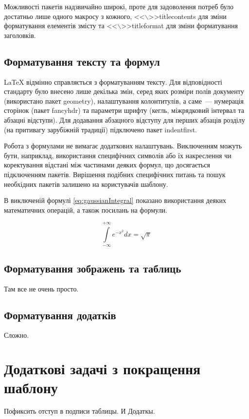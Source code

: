 Можливості пакетів надзвичайно широкі, проте для задоволення потреб було достатньо лише одного макросу з кожного, <<$\backslash$>>titlecontents для зміни форматування елементів змісту та <<$\backslash$>>titleformat для зміни форматування заголовків.

\subsection{Форматування тексту та формул}

\LaTeX{} відмінно справляється з форматуванням тексту. Для відповідності стандарту було внесено лише декілька змін, серед яких розміри полів документу (використано пакет geometry), налаштування колонтитулів, а саме~--- нумерація сторінок (пакет fancyhdr) та параметри шрифту (кегль, міжрядковий інтервал та абзацні відступи). Для додавання абзацного відступу для перших абзаців розділу (на притивагу зарубіжній традиції) підключено пакет indentfirst.

Робота з формулами не вимагає додаткових налаштувань. Виключенням можуть бути, наприклад, використання специфічних символів або їх накреслення чи коректування відстані між частинами деяких формул, що досягається підключенням пакетів. Вирішення подібних специфічних питань та пошук необхідних пакетів залишено на користувачів шаблону.

В виключеній формулі \ref{eq:gaussianIntegral} показано використання деяких математичних операцій, а також посилань на формули.

\begin{equation}
\label{eq:gaussianIntegral}
\int\limits^{+\infty}_{-\infty} e^{-x^2} dx = \sqrt{\pi} 
\end{equation}

\subsection{Форматування зображень та таблиць}
Там все не очень просто.

\subsection{Форматування додатків}

Сложно. 

\section{Додаткові задачі з покращення шаблону}

Пофиксить отступ в подписи таблицы. И Додаткы.
